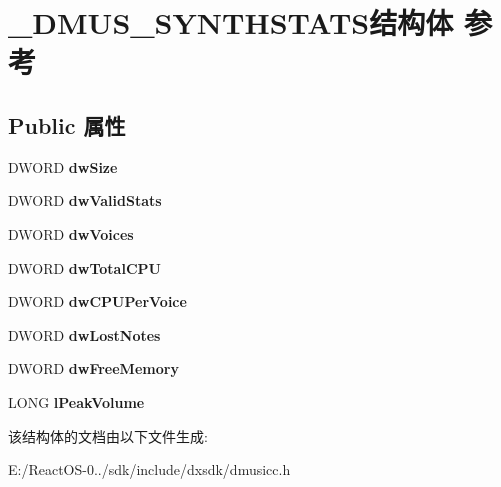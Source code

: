\hypertarget{struct___d_m_u_s___s_y_n_t_h_s_t_a_t_s}{}\section{\+\_\+\+D\+M\+U\+S\+\_\+\+S\+Y\+N\+T\+H\+S\+T\+A\+T\+S结构体 参考}
\label{struct___d_m_u_s___s_y_n_t_h_s_t_a_t_s}
\subsection*{Public 属性}
\begin{DoxyCompactItemize}
\item 
\mbox{\label{struct___d_m_u_s___s_y_n_t_h_s_t_a_t_s_abd6ae46e48839fcf4975f2eee44a807a}} 
D\+W\+O\+RD {\bfseries dw\+Size}
\item 
\mbox{\label{struct___d_m_u_s___s_y_n_t_h_s_t_a_t_s_a1e176362ea5bbe2abda1e080aa4937ab}} 
D\+W\+O\+RD {\bfseries dw\+Valid\+Stats}
\item 
\mbox{\label{struct___d_m_u_s___s_y_n_t_h_s_t_a_t_s_a1b78b2118fb4769980d6370c33e16820}} 
D\+W\+O\+RD {\bfseries dw\+Voices}
\item 
\mbox{\label{struct___d_m_u_s___s_y_n_t_h_s_t_a_t_s_a71114086c7a5764043cf94c308911670}} 
D\+W\+O\+RD {\bfseries dw\+Total\+C\+PU}
\item 
\mbox{\label{struct___d_m_u_s___s_y_n_t_h_s_t_a_t_s_a0a16d5951d2c3aa84f0ce702e959e364}} 
D\+W\+O\+RD {\bfseries dw\+C\+P\+U\+Per\+Voice}
\item 
\mbox{\label{struct___d_m_u_s___s_y_n_t_h_s_t_a_t_s_aa2bae95b96bcfb071d340e26f1003d28}} 
D\+W\+O\+RD {\bfseries dw\+Lost\+Notes}
\item 
\mbox{\label{struct___d_m_u_s___s_y_n_t_h_s_t_a_t_s_aa55852e496fad6e3c4676537c36ef99c}} 
D\+W\+O\+RD {\bfseries dw\+Free\+Memory}
\item 
\mbox{\label{struct___d_m_u_s___s_y_n_t_h_s_t_a_t_s_ad6cce0eeee5c4a454a3a29dc7efadcf3}} 
L\+O\+NG {\bfseries l\+Peak\+Volume}
\end{DoxyCompactItemize}


该结构体的文档由以下文件生成\+:\begin{DoxyCompactItemize}
\item 
E\+:/\+React\+O\+S-\/0../sdk/include/dxsdk/dmusicc.\+h\end{DoxyCompactItemize}

